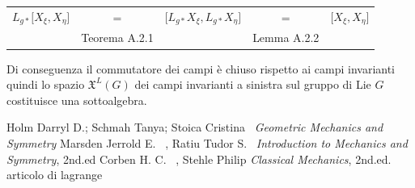 \documentclass[11pt]{report}
\theoremstyle{plain}
\theoremstyle{definition}
\theoremstyle{remark}
\begin{document}
\begin{table}[h!]
\begin{center}
\begin{tabular}{rcccl}
$L_{g \ast} \bigr[ X_{\xi}, X_{\eta}]$& = & $\bigr[L_{g \ast}X_{\xi}, L_{g \ast}X_{\eta} \bigr] $ & = & $\bigr[X_{\xi}, X_{\eta}] $\\
 & Teorema A.2.1 & & Lemma A.2.2 & \\
\end{tabular}
\end{center}
\end{table} 
Di conseguenza il commutatore dei campi è chiuso rispetto ai campi invarianti quindi lo spazio $\mathfrak{X}^{L}(G) $ dei campi invarianti a sinistra sul gruppo di Lie $G$ costituisce una sottoalgebra.


\clearpage
\begin{thebibliography}{99}
Holm Darryl D.; Schmah Tanya; Stoica Cristina \, \emph{Geometric Mechanics and Symmetry}
Marsden Jerrold E. \, , Ratiu Tudor S. \, \emph{Introduction to Mechanics and Symmetry}, 2nd.ed
 Corben H. C. \, , Stehle Philip \emph{Classical Mechanics}, 2nd.ed.
 articolo di lagrange
\end{thebibliography}
\end{document}
